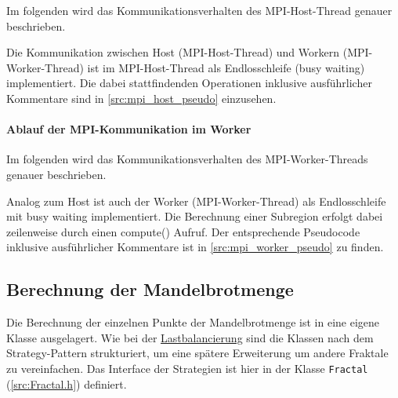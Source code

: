 Im folgenden wird das Kommunikationsverhalten des MPI-Host-Thread genauer beschrieben.


Die Kommunikation zwischen Host (MPI-Host-Thread) und Workern (MPI-Worker-Thread) ist im MPI-Host-Thread als Endlosschleife (busy waiting) implementiert. Die dabei stattfindenden Operationen inklusive ausführlicher Kommentare sind in \autoref{src:mpi_host_pseudo} einzusehen.

\begin{figure}[!h]
	
\end{figure}

\paragraph{Ablauf der MPI-Kommunikation im Worker}\label{para:impl_mpi_worker}

Im folgenden wird das Kommunikationsverhalten des MPI-Worker-Threads genauer beschrieben. 

Analog zum Host ist auch der Worker (MPI-Worker-Thread) als Endlosschleife mit busy waiting implementiert. Die Berechnung einer Subregion erfolgt dabei zeilenweise durch einen compute() Aufruf. Der entsprechende Pseudocode inklusive ausführlicher Kommentare ist in \autoref{src:mpi_worker_pseudo} zu finden.

\begin{figure}[!h]
	
\end{figure}


\subsection{Berechnung der Mandelbrotmenge}\label{sec:mandelbrot_calculation}

Die Berechnung der einzelnen Punkte der Mandelbrotmenge ist in eine eigene Klasse ausgelagert.
Wie bei der \hyperref[sec:load_balancing]{Lastbalancierung} sind die Klassen nach dem Strategy-Pattern strukturiert, um eine spätere Erweiterung um andere Fraktale zu vereinfachen.
Das Interface der Strategien ist hier in der Klasse \verb|Fractal| (\autoref{src:Fractal.h}) definiert.

\begin{figure}
	
\end{figure}

